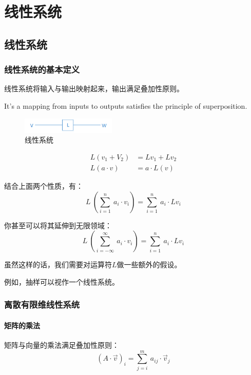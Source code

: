 \chapter{线性系统}
\section{线性系统}
\subsection{线性系统的基本定义}
线性系统将输入与输出映射起来，输出满足叠加性原则。

It's a mapping from inputs to outputs satisfies the principle of superposition.
\begin{figure}[H]
	\centering
	\includegraphics[width=0.4\textwidth]{assets/LinearSystem.png}
	\caption{线性系统}
\end{figure}

\begin{align*}
	L(v_1+V_2)  & =Lv_1+Lv_2   \\
	L(a\cdot v) & =a\cdot L(v)
\end{align*}

结合上面两个性质，有：
\begin{equation}
	L\ (\sum\limits_{i=1}^n\ a_i\cdot v_i)=\sum\limits_{i=1}^n\ a_i\cdot Lv_i
\end{equation}

你甚至可以将其延伸到无限领域：
\begin{equation}
	L\ (\sum\limits_{i=-\infty}^\infty\ a_i\cdot v_i)=\sum\limits_{i=1}^n\ a_i\cdot Lv_i
\end{equation}

虽然这样的话，我们需要对运算符$L$做一些额外的假设。

例如，抽样可以视作一个线性系统。

\subsection{离散有限维线性系统}
\subsubsection{矩阵的乘法}
矩阵与向量的乘法满足叠加性原则：
\begin{equation}
	(A\cdot \vec{v})_i=\sum\limits_{j=i}^m\ a_{ij}\cdot \vec{v}_j
\end{equation}

